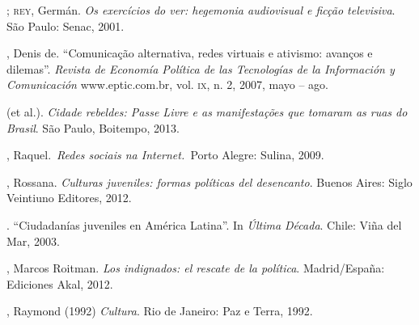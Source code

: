 \begin{bibliohedra}
\titidem; \textsc{rey}, Germán. \emph{Os exercícios do ver:
hegemonia audiovisual e ficção televisiva}. São Paulo: Senac, 2001.

, Denis de. ``Comunicação alternativa, redes virtuais e ativismo:
avanços e dilemas''. \emph{Revista de Economía Política de las
Tecnologías de la Información y Comunicación} www.eptic.com.br, vol. \textsc{ix},
n. 2, 2007, mayo -- ago.

 (et al.). \emph{Cidade rebeldes: Passe Livre e as
manifestações que tomaram as ruas do Brasil}. São Paulo, Boitempo, 2013.

, Raquel.~\emph{Redes sociais na Internet.~}Porto Alegre: Sulina,
2009.

, Rossana. \emph{Culturas juveniles: formas políticas del
desencanto}. Buenos Aires: Siglo Veintiuno Editores, 2012.

\titidem. ``Ciudadanías juveniles en América
Latina''. In \emph{Última Década}. Chile: Viña del Mar, 2003.

, Marcos Roitman. \emph{Los indignados: el rescate de la
política}. Madrid/España: Ediciones Akal, 2012.

, Raymond (1992) \emph{Cultura}. Rio de Janeiro: Paz e Terra,
1992.
\end{bibliohedra}




